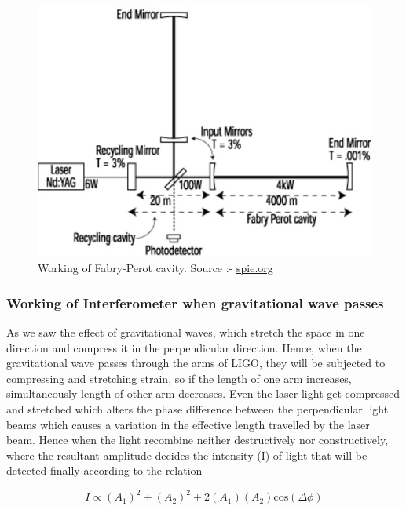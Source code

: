 \begin{figure}[h]
    \centering
    \includegraphics[scale=0.7]{images.tex/Working of Fabry-Perot cavity.jpg}
    \caption{Working of Fabry-Perot cavity. Source :- \href{https://spie.org/news/ligo-researchers-design-complex-device-to-detect-infinitesimal-changes?SSO=1}{spie.org}}
\end{figure}

\subsubsection{Working of Interferometer when gravitational wave passes}

As we saw the effect of gravitational waves, which stretch the space in one direction and compress it in the perpendicular direction. Hence, when the gravitational wave passes through the arms of LIGO, they will be subjected to compressing and stretching strain, so if the length of one arm increases, simultaneously length of other arm decreases. Even the laser light get compressed and stretched which alters the phase difference between the perpendicular light beams which causes a variation in the effective length travelled by the laser beam. Hence when the light recombine neither destructively nor constructively, where the resultant amplitude decides the intensity (I) of light that will be detected finally according to the relation

\begin{equation}
     I \propto (A_1)^2 + (A_2)^2 + 2(A_1)(A_2)\text{cos}(\Delta \phi)
\end{equation}

